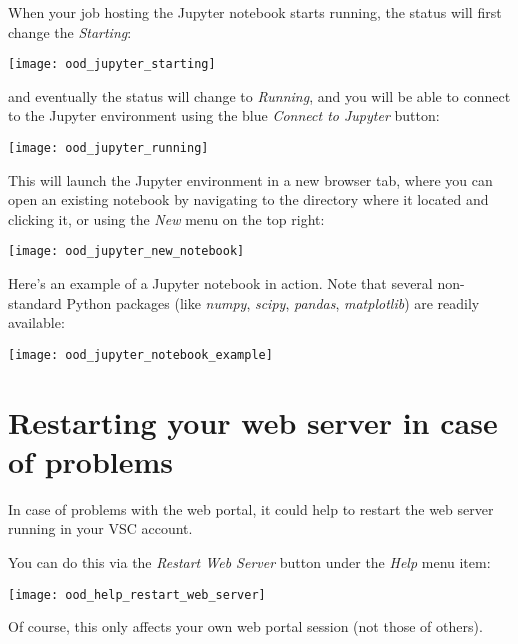 When your job hosting the Jupyter notebook starts running, the status will first change the \emph{Starting}:

\begin{center}
    \texttt{[image: ood\_jupyter\_starting]}
\end{center}

and eventually the status will change to \emph{Running}, and you will be able to connect
to the Jupyter environment using the blue \emph{Connect to Jupyter} button:

\begin{center}
    \texttt{[image: ood\_jupyter\_running]}
\end{center}

This will launch the Jupyter environment in a new browser tab, where you can open
an existing notebook by navigating to the directory where it located and clicking it,
or using the \emph{New} menu on the top right:

\begin{center}
    \texttt{[image: ood\_jupyter\_new\_notebook]}
\end{center}

Here's an example of a Jupyter notebook in action. Note that several non-standard Python packages
(like \emph{numpy}, \emph{scipy}, \emph{pandas}, \emph{matplotlib}) are readily available:

\begin{center}
    \texttt{[image: ood\_jupyter\_notebook\_example]}
\end{center}


\section{Restarting your web server in case of problems}

In case of problems with the web portal, it could help to restart the web server running in your VSC account.

You can do this via the \emph{Restart Web Server} button under the \emph{Help} menu item:

\begin{center}
    \texttt{[image: ood\_help\_restart\_web\_server]}
\end{center}

Of course, this only affects your own web portal session (not those of others).
